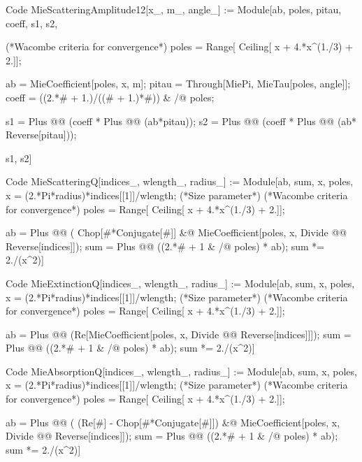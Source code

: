 {\footnotesize
\begin{mmaCell}[
	pattern = {x_, m_, x, m, angle_, angle, \#},
	local = {ab, poles, pitau, coeff,  s1, s2}
	]{Code}
  MieScatteringAmplitude12[x_, m_, angle_] :=
   Module[{ab, poles, pitau, coeff,  s1, s2},

   (*Wacombe criteria for convergence*)
   poles = Range[ Ceiling[ x + 4.*x^(1./3) + 2.]];

   ab = MieCoefficient[poles, x, m];
   pitau = Through[{MiePi, MieTau}[poles, angle]];
   coeff = ((2.*# + 1.)/((# + 1.)*#)) & /@ poles;

   s1 = Plus @@ (coeff * Plus @@ (ab*pitau));
   s2 = Plus @@ (coeff * Plus @@ (ab* Reverse[pitau]));

  {s1, s2}]
\end{mmaCell}
}

{\footnotesize
\begin{mmaCell}[
	pattern = {indices_, wlength_, radius_, indices, wlength, radius, \#},
	local = {ab, sum, x, poles}
	]{Code}
  MieScatteringQ[indices_, wlength_, radius_] :=
   Module[{ab, sum, x, poles},
    x = (2.*Pi*radius)*indices[[1]]/wlength; (*Size parameter*)
    (*Wacombe criteria for convergence*)
    poles = Range[ Ceiling[ x + 4.*x^(1./3) + 2.]];

    ab = Plus @@ ( Chop[#*Conjugate[#]] &@
    		 MieCoefficient[poles, x, Divide @@ Reverse[indices]]);
    sum = Plus @@ ((2.*# + 1 & /@ poles) * ab);
   sum *= 2./(x^2)]
\end{mmaCell}
}

{\footnotesize
\begin{mmaCell}[
	pattern = {indices_, wlength_, radius_, indices, wlength, radius, \#},
	local = {ab, sum, x, poles}
	]{Code}
  MieExtinctionQ[indices_, wlength_, radius_] :=
   Module[{ab, sum, x, poles},
    x = (2.*Pi*radius)*indices[[1]]/wlength; (*Size parameter*)
    (*Wacombe criteria for convergence*)
    poles = Range[ Ceiling[ x + 4.*x^(1./3) + 2.]];

    ab = Plus @@ (Re[MieCoefficient[poles, x, Divide @@ Reverse[indices]]]);
    sum = Plus @@ ((2.*# + 1 & /@ poles) * ab);
   sum *= 2./(x^2)]
\end{mmaCell}
}

{\footnotesize
\begin{mmaCell}[
	pattern = {indices_, wlength_, radius_, indices, wlength, radius, \#},
	local = {ab, sum, x, poles}
	]{Code}
  MieAbsorptionQ[indices_, wlength_, radius_] :=
   Module[{ab, sum, x, poles},
    x = (2.*Pi*radius)*indices[[1]]/wlength; (*Size parameter*)
    (*Wacombe criteria for convergence*)
    poles = Range[ Ceiling[ x + 4.*x^(1./3) + 2.]];

    ab = Plus @@ ( (Re[#] - Chop[#*Conjugate[#]]) &@
    		  MieCoefficient[poles, x, Divide @@ Reverse[indices]]);
    sum = Plus @@ ((2.*# + 1 & /@ poles) * ab);
   sum *= 2./(x^2)]
\end{mmaCell}
}
